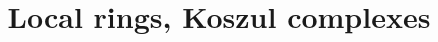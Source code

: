 \documentclass{ximera}
\title{Local rings, Koszul complexes}
\begin{document}
\begin{abstract}

\end{abstract}
\maketitle

\end{document}
